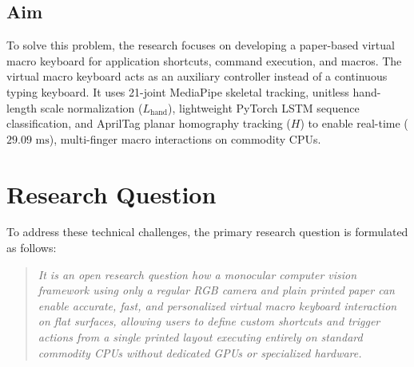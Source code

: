 \subsection{Aim}
\label{subsec:irca_aim}
To solve this problem, the research focuses on developing a paper-based virtual macro keyboard for application shortcuts, command execution, and macros. The virtual macro keyboard acts as an auxiliary controller instead of a continuous typing keyboard. It uses 21-joint MediaPipe skeletal tracking, unitless hand-length scale normalization ($L_{\text{hand}}$), lightweight PyTorch LSTM sequence classification, and AprilTag planar homography tracking ($H$) to enable real-time ($29.09\text{ ms}$), multi-finger macro interactions on commodity CPUs.

\section{Research Question}
\label{sec:research_question}
To address these technical challenges, the primary research question is formulated as follows:

\begin{quote}
\textit{It is an open research question how a monocular computer vision framework using only a regular RGB camera and plain printed paper can enable accurate, fast, and personalized virtual macro keyboard interaction on flat surfaces, allowing users to define custom shortcuts and trigger actions from a single printed layout executing entirely on standard commodity CPUs without dedicated GPUs or specialized hardware.}
\end{quote}

